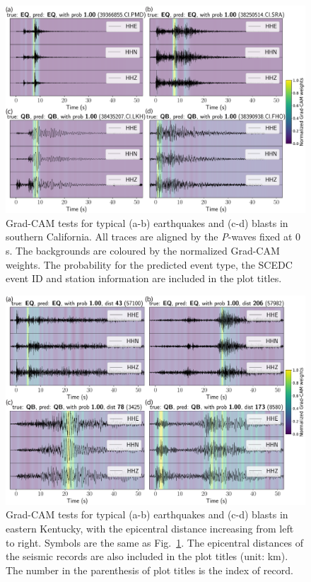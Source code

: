\documentclass{gji}
\begin{document}
\begin{figure}
\centering
\includegraphics[width=.99\textwidth]{grad_CAM.pdf}
\caption{Grad-CAM tests for typical (a-b) earthquakes and (c-d) blasts in southern California. All traces are aligned by the \textit{P}-waves fixed at 0 s. The backgrounds are coloured by the normalized Grad-CAM weights. The probability for the predicted event type, the SCEDC event ID and station information are included in the plot titles.}
\label{cam}
\end{figure}

\begin{figure}
\centering
\includegraphics[width=.99\textwidth]{grad_CAM_ek.pdf}
\caption{Grad-CAM tests for typical (a-b) earthquakes and (c-d) blasts in eastern Kentucky, with the epicentral distance increasing from left to right. Symbols are the same as Fig.~\ref{cam}. The epicentral distances of the seismic records are also included in the plot titles (unit: km). The number in the parenthesis of plot titles is the index of record.}
\label{cam_ek}
\end{figure}
\end{document}
